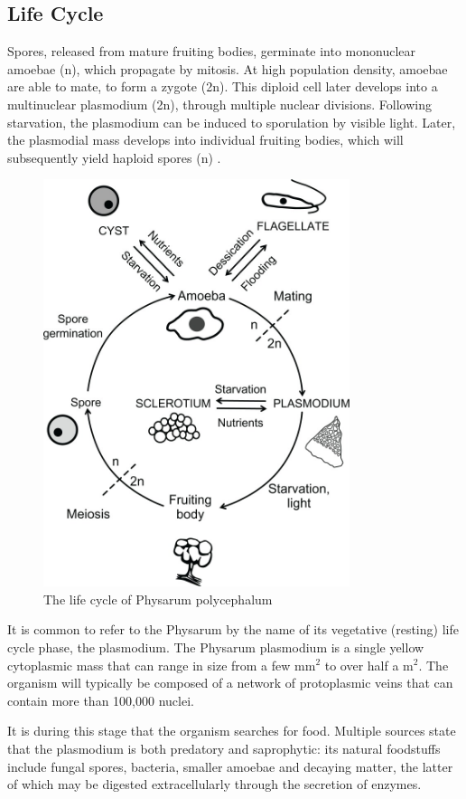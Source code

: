 \subsection{Life Cycle}
Spores, released from mature fruiting bodies, germinate into mononuclear amoebae (n), which propagate by mitosis. At high population density, amoebae are able to mate, to form a zygote (2n). This diploid cell later develops into a multinuclear plasmodium (2n), through multiple nuclear divisions. Following starvation, the plasmodium can be induced to sporulation by visible light. Later, the plasmodial mass develops into individual fruiting bodies, which will subsequently yield haploid spores (n) \cite{physlf}.

\begin{figure}
  \centering
    \includegraphics[width=0.8\textwidth]{physarum_life_cycle}%
    
  \caption{The life cycle of Physarum polycephalum\cite{physlf}}
  \label{fig:physarum_life_cycle}
\end{figure}


It is common to refer to the Physarum by the name of its vegetative (resting) life cycle phase, the plasmodium. The Physarum plasmodium is a single yellow cytoplasmic mass that can range in size from a few mm$^2$ to over half a m$^2$. The organism will typically be composed of a network of protoplasmic veins that can contain more than 100,000 nuclei.
\par
It is during this stage that the organism searches for food. Multiple sources state that the plasmodium is both predatory and saprophytic: its natural foodstuffs include fungal spores, bacteria, smaller amoebae and decaying matter, the latter of which may be digested extracellularly through the secretion of enzymes.

